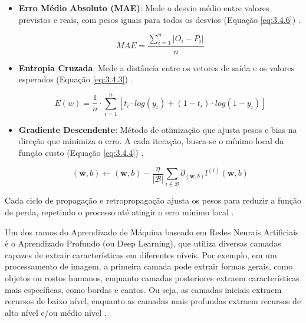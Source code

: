 \begin{itemize}
\begin{itemize}
            \begin{equation}
                RMSE = \sqrt{\frac{1}{n} \sum_{i=1}^{n} e_i^2}
                \label{eq:3.4.2}
            \end{equation}
        
        \item \textbf{Erro Médio Absoluto (MAE)}: Mede o desvio médio entre valores previstos e reais, com pesos iguais para todos os desvios (Equação \ref{eq:3.4.6}) \cite{willmott1981}.

            \begin{equation}
                MAE = \frac{ \sum_{i=1}^{n} |O_{i} - P_{i}|}{n}
                \label{eq:3.4.6}
            \end{equation}
        
        \item \textbf{Entropia Cruzada}: Mede a distância entre os vetores de saída e os valores esperados (Equação \ref{eq:3.4.3}) \cite{nasr2002}.

            \begin{equation}
                E(w) = \frac{1}{n} \cdot \sum_{i=1}^{n} [t_{i} \cdot log(y_{i}) + (1 - t_{i}) \cdot log(1 - y_{i})]
                \label{eq:3.4.3}
            \end{equation}
        
        \item \textbf{Gradiente Descendente}: Método de otimização que ajusta pesos e bias na direção que minimiza o erro. A cada iteração, busca-se o mínimo local da função custo (Equação \ref{eq:3.4.4}) \cite{rumelhart1986}.

            \begin{equation}
                (\mathbf{w},b) \leftarrow (\mathbf{w},b) - \frac{\eta}{|\mathcal{B}|} \sum_{i \in \mathcal{B}} \partial_{(\mathbf{w},b)} l^{(i)}(\mathbf{w},b)
                \label{eq:3.4.4}
            \end{equation}
    \end{itemize}
\end{itemize}

Cada ciclo de propagação e retropropagação ajusta os pesos para reduzir a função de perda, repetindo o processo até atingir o erro mínimo local \cite{russel2010}.

Um dos ramos do Aprendizado de Máquina baseado em Redes Neurais Artificiais é o Aprendizado Profundo (ou Deep Learning), que utiliza diversas camadas capazes de extrair características em diferentes níveis. Por exemplo, em um processamento de imagem, a primeira camada pode extrair formas gerais, como objetos ou rostos humanos, enquanto camadas posteriores extraem características mais específicas, como bordas e cantos. Ou seja, as camadas iniciais extraem recursos de baixo nível, enquanto as camadas mais profundas extraem recursos de alto nível e/ou médio nível \cite{schmidhuber2015}.

